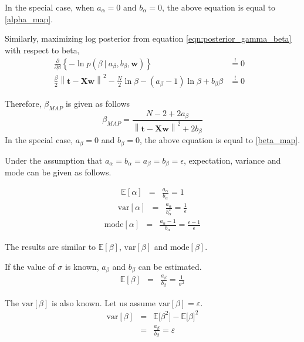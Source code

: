 \documentclass[11pt]{article}
\newcommand{\mean}[1]{\mathbb{E}\left[#1\right]}
\newcommand\given[1][]{\:#1\vert\:}
\newcommand{\norm}[1]{\left\lVert#1\right\rVert}
\begin{document}
In the special case, when $a_{\alpha} = 0$ and $b_{\alpha} = 0$, the above equation is equal to \ref{alpha_map}.

Similarly, maximizing log posterior from equation \ref{eqn:posterior_gamma_beta} with respect to beta,
\begin{eqnarray}
    \frac{\partial }{\partial  \beta} \left\{ -\ln{p(\beta \given a_{\beta}, b_{\beta}, \bm{w})} \right\}
    &\overset{!}{=} 0&  \\
    \frac{\beta}{2}\norm{\bm{t}-\bm{X}\bm{w}}^2 - \frac{N}{2}\ln{\beta} - \left( a_{\beta} - 1 \right)\ln{\beta} + b_{\beta}\beta
    &\overset{!}{=} 0&
\end{eqnarray}

Therefore, $\beta_{MAP}$ is given as follows
\begin{equation}
    \beta_{MAP} = \frac{N-2 + 2a_{\beta}}{\norm{\bm{t}-\bm{X}\bm{w}}^2+2b_{\beta}}
\end{equation}
In the special case, $a_{\beta} = 0$ and $b_{\beta} = 0$, the above equation is equal to \ref{beta_map}.

Under the assumption that $a_{\alpha} = b_{\alpha} = a_{\beta} = b_{\beta} = \epsilon$, expectation, variance and mode can be given as follows.

\begin{eqnarray}
    \mean{\alpha}
    &=& \frac{a_{\alpha}}{b_{\alpha}} = 1
\end{eqnarray}
\begin{eqnarray}
    \text{var} \left[\alpha\right]
    &=& \frac{a_{\alpha}}{b_{\alpha}^2} = \frac{1}{\epsilon}
\end{eqnarray}
\begin{eqnarray}
    \text{mode}\left[\alpha\right] &=& \frac{a_{\alpha}-1}{b_{\alpha}} = \frac{\epsilon-1}{\epsilon}
\end{eqnarray}

The results are similar to $\mean{\beta}$, $\text{var}\left[\beta\right]$ and $\text{mode}\left[\beta\right]$.

If the value of $\sigma$ is known, $a_{\beta}$ and $b_{\beta}$ can be estimated.
\begin{eqnarray}
    \mean{\beta} &=& \frac{a_{\beta}}{b_{\beta}} = \frac{1}{\sigma^2}
\end{eqnarray}

The $\text{var}\left[\beta\right]$ is also known. Let us assume $\text{var}\left[\beta\right] = \varepsilon$.
\begin{eqnarray}
    \text{var}\left[\beta\right]
    &=& \mathbb{E}\big[\beta^2\big] - \mathbb{E}\big[\beta\big]^2 \\
    &=& \frac{a_{\beta}}{b_{\beta}} = \varepsilon
\end{eqnarray}
\end{document}
